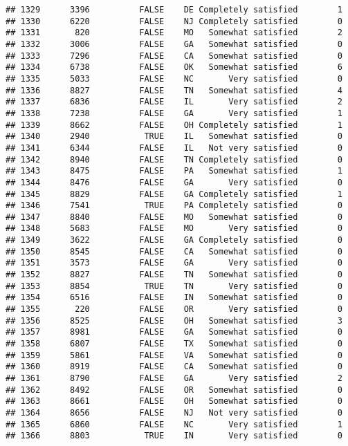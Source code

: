 \documentclass[]{book}
\theoremstyle{definition}
\theoremstyle{definition}
\theoremstyle{remark}
\begin{document}
\begin{verbatim}
## 1329      3396          FALSE    DE Completely satisfied        1
## 1330      6220          FALSE    NJ Completely satisfied        0
## 1331       820          FALSE    MO   Somewhat satisfied        2
## 1332      3006          FALSE    GA   Somewhat satisfied        0
## 1333      7296          FALSE    CA   Somewhat satisfied        0
## 1334      6738          FALSE    OK   Somewhat satisfied        6
## 1335      5033          FALSE    NC       Very satisfied        0
## 1336      8827          FALSE    TN   Somewhat satisfied        4
## 1337      6836          FALSE    IL       Very satisfied        2
## 1338      7238          FALSE    GA       Very satisfied        1
## 1339      8662          FALSE    OH Completely satisfied        1
## 1340      2940           TRUE    IL   Somewhat satisfied        0
## 1341      6344          FALSE    IL   Not very satisfied        0
## 1342      8940          FALSE    TN Completely satisfied        0
## 1343      8475          FALSE    PA   Somewhat satisfied        1
## 1344      8476          FALSE    GA       Very satisfied        0
## 1345      8829          FALSE    GA Completely satisfied        1
## 1346      7541           TRUE    PA Completely satisfied        0
## 1347      8840          FALSE    MO   Somewhat satisfied        0
## 1348      5683          FALSE    MO       Very satisfied        0
## 1349      3622          FALSE    GA Completely satisfied        0
## 1350      8545          FALSE    CA   Somewhat satisfied        0
## 1351      3573          FALSE    GA       Very satisfied        0
## 1352      8827          FALSE    TN   Somewhat satisfied        0
## 1353      8854           TRUE    TN       Very satisfied        0
## 1354      6516          FALSE    IN   Somewhat satisfied        0
## 1355       220          FALSE    OR       Very satisfied        0
## 1356      8525          FALSE    OH   Somewhat satisfied        3
## 1357      8981          FALSE    GA   Somewhat satisfied        0
## 1358      6807          FALSE    TX   Somewhat satisfied        0
## 1359      5861          FALSE    VA   Somewhat satisfied        0
## 1360      8919          FALSE    CA   Somewhat satisfied        0
## 1361      8790          FALSE    GA       Very satisfied        2
## 1362      8492          FALSE    OR   Somewhat satisfied        0
## 1363      8661          FALSE    OH   Somewhat satisfied        0
## 1364      8656          FALSE    NJ   Not very satisfied        0
## 1365      6860          FALSE    NC       Very satisfied        1
## 1366      8803           TRUE    IN       Very satisfied        0

\end{verbatim}
\end{document}
